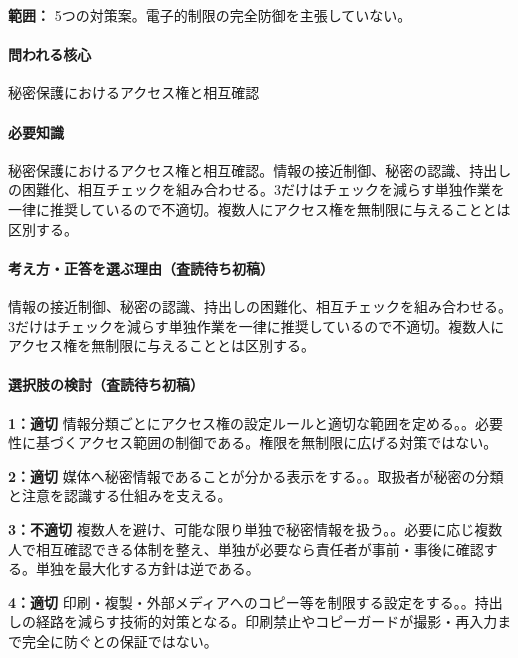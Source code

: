 \noindent\textbf{範囲：} 5つの対策案。電子的制限の完全防御を主張していない。\par

\paragraph{問われる核心} 秘密保護におけるアクセス権と相互確認

\paragraph{必要知識} 秘密保護におけるアクセス権と相互確認。情報の接近制御、秘密の認識、持出しの困難化、相互チェックを組み合わせる。3だけはチェックを減らす単独作業を一律に推奨しているので不適切。複数人にアクセス権を無制限に与えることとは区別する。

\paragraph{考え方・正答を選ぶ理由（査読待ち初稿）} 情報の接近制御、秘密の認識、持出しの困難化、相互チェックを組み合わせる。3だけはチェックを減らす単独作業を一律に推奨しているので不適切。複数人にアクセス権を無制限に与えることとは区別する。

\paragraph{選択肢の検討（査読待ち初稿）}\mbox{}\par

\noindent\textbf{1：適切} 情報分類ごとにアクセス権の設定ルールと適切な範囲を定める。。必要性に基づくアクセス範囲の制御である。権限を無制限に広げる対策ではない。\par

\noindent\textbf{2：適切} 媒体へ秘密情報であることが分かる表示をする。。取扱者が秘密の分類と注意を認識する仕組みを支える。\par

\noindent\textbf{3：不適切} 複数人を避け、可能な限り単独で秘密情報を扱う。。必要に応じ複数人で相互確認できる体制を整え、単独が必要なら責任者が事前・事後に確認する。単独を最大化する方針は逆である。\par

\noindent\textbf{4：適切} 印刷・複製・外部メディアへのコピー等を制限する設定をする。。持出しの経路を減らす技術的対策となる。印刷禁止やコピーガードが撮影・再入力まで完全に防ぐとの保証ではない。\par

